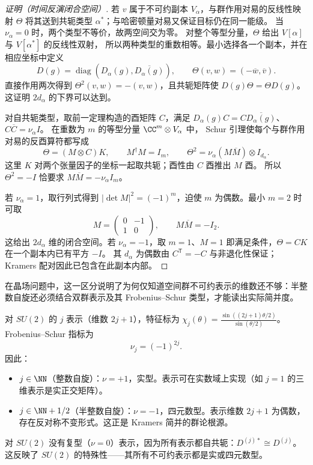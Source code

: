 \par\medskip
\begin{proof}[证明（时间反演闭合空间）]
若 $v$ 属于不可约副本 $V_\alpha$，与群作用对易的反线性映射 $\Theta$
将其送到共轭类型 $\alpha^*$；与哈密顿量对易又保证目标仍在同一能级。
当 $\nu_\alpha=0$ 时，两个类型不等价，故两空间交为零。
对整个等型分量，$\Theta$ 给出 $V[\alpha]$ 与 $V[\alpha^*]$ 的反线性双射，
所以两种类型的重数相等。最小选择各一个副本，并在相应坐标中定义
\[
D(g)=\operatorname{diag}(D_\alpha(g),\overline{D_\alpha(g)}),\qquad
\Theta(v,w)=(-\overline w,\overline v).
\]
直接作用两次得到 $\Theta^2(v,w)=-(v,w)$，且共轭矩阵使 $D(g)\Theta=\Theta D(g)$。
这证明 $2d_\alpha$ 的下界可以达到。

对自共轭类型，取前一定理构造的酉矩阵 $C$，满足
$D_\alpha(g)C=C\overline{D_\alpha(g)}$、$C\overline C=\nu_\alpha I$。
在重数为 $m$ 的等型分量 $\CC^m\otimes V_\alpha$ 中，
Schur 引理使每个与群作用对易的反酉算符都写成
\[
\Theta=(M\otimes C)K,\qquad M^\dagger M=I_m,
\qquad \Theta^2=\nu_\alpha(M\overline M)\otimes I_{d_\alpha}.
\]
这里 $K$ 对两个张量因子的坐标一起取共轭；酉性由 $C$ 酉推出 $M$ 酉。
所以 $\Theta^2=-I$ 恰要求 $M\overline M=-\nu_\alpha I_m$。

若 $\nu_\alpha=1$，取行列式得到
$|\det M|^2=(-1)^m$，迫使 $m$ 为偶数。最小 $m=2$ 时可取
\[
M=\begin{pmatrix}0&-1\\1&0\end{pmatrix},\qquad M\overline M=-I_2.
\]
这给出 $2d_\alpha$ 维的闭合空间。若 $\nu_\alpha=-1$，取 $m=1$、$M=1$
即满足条件，$\Theta=CK$ 在一个副本内已有平方 $-I$。
其 $d_\alpha$ 为偶数由 $C^{\mathsf T}=-C$ 与非退化性保证；Kramers 配对因此已包含在此副本内部。
\end{proof}\par\medskip

在晶场问题中，这一区分说明了为何仅知道空间群不可约表示的维数还不够：半整数自旋还必须结合双群表示及其 Frobenius--Schur 类型，才能读出实际简并度。

\begin{example}
对 $SU(2)$ 的 $j$ 表示（维数 $2j+1$），特征标为 $\chi_j(\theta)=\frac{\sin((2j+1)\theta/2)}{\sin(\theta/2)}$。Frobenius--Schur 指标为
\[
\nu_j=(-1)^{2j}.
\]
因此：
\begin{itemize}
\item $j\in\NN$（整数自旋）：$\nu=+1$，实型。表示可在实数域上实现（如 $j=1$ 的三维表示是实正交矩阵）。
\item $j\in\NN+1/2$（半整数自旋）：$\nu=-1$，四元数型。表示维数 $2j+1$ 为偶数，存在反对称不变形式。这正是 Kramers 简并的群论根源。
\end{itemize}
对 $SU(2)$ 没有复型（$\nu=0$）表示，因为所有表示都自共轭：$D^{(j)*}\cong D^{(j)}$。这反映了 $SU(2)$ 的特殊性——其所有不可约表示都是实或四元数型。
\end{example}

